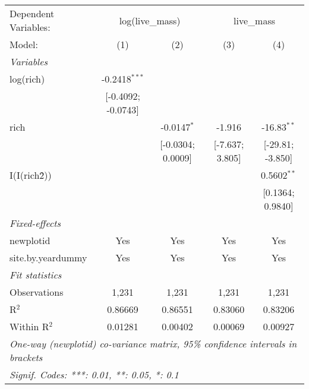\begin{tabular}{lcccc}
\tabularnewline\midrule\midrule
Dependent Variables:&\multicolumn{2}{c}{log(live\_mass)}&\multicolumn{2}{c}{live\_mass}\\
Model:&(1) & (2) & (3) & (4)\\
\midrule \emph{Variables}&   &   &   &  \\
log(rich)&-0.2418$^{***}$ &    &    &   \\
  &[-0.4092; -0.0743] &    &    &   \\
rich&   & -0.0147$^{*}$ & -1.916 & -16.83$^{**}$\\
  &   & [-0.0304; 0.0009] & [-7.637; 3.805] & [-29.81; -3.850]\\
I(I(rich\^2))&   &    &    & 0.5602$^{**}$\\
  &   &    &    & [0.1364; 0.9840]\\
\midrule \emph{Fixed-effects}&   &   &   &  \\
newplotid & Yes & Yes & Yes & Yes\\
site.by.yeardummy & Yes & Yes & Yes & Yes\\
\midrule \emph{Fit statistics}&  & & & \\
Observations & 1,231&1,231&1,231&1,231\\
R$^2$ & 0.86669&0.86551&0.83060&0.83206\\
Within R$^2$ & 0.01281&0.00402&0.00069&0.00927\\
\midrule\midrule\multicolumn{5}{l}{\emph{One-way (newplotid) co-variance matrix, 95\% confidence intervals in brackets}}\\
\multicolumn{5}{l}{\emph{Signif. Codes: ***: 0.01, **: 0.05, *: 0.1}}\\
\end{tabular}


